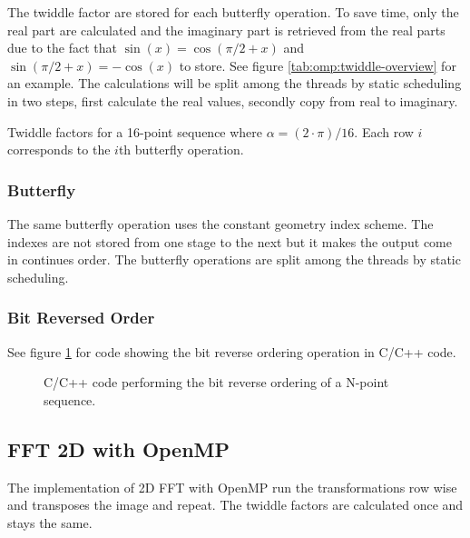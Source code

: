 The twiddle factor are stored for each butterfly operation. To save time, only the real part are calculated and the imaginary part is retrieved from the real parts due to the fact that $\sin(x) = \cos(\pi/2 + x)$ and $\sin(\pi/2 + x) = -\cos(x)$ to store. See figure \ref{tab:omp:twiddle-overview} for an example. The calculations will be split among the threads by static scheduling in two steps, first calculate the real values, secondly copy from real to imaginary.

\begin{table}[H]
	\centering
	
	\caption{Twiddle factors for a 16-point sequence where $\alpha = (2 \cdot \pi) / 16$. Each row $i$ corresponds to the $i$th butterfly operation.}
	\label{tab:omp:twiddle-overview}
\end{table}

\subsubsection{Butterfly}

The same butterfly operation uses the constant geometry index scheme. The indexes are not stored from one stage to the next but it makes the output come in continues order. The butterfly operations are split among the threads by static scheduling.

\subsubsection{Bit Reversed Order}

See figure \ref{fig:omp:bit-reverse-order} for code showing the bit reverse ordering operation in C/C++ code.

\begin{figure}[H]
	\centering
	\begin{framed}
			
	\end{framed}
	\caption{ C/C++ code performing the bit reverse ordering of a N-point sequence. }
	\label{fig:omp:bit-reverse-order}
\end{figure}

\subsection{FFT 2D with OpenMP}

The implementation of 2D FFT with OpenMP run the transformations row wise and transposes the image and repeat. The twiddle factors are calculated once and stays the same.

